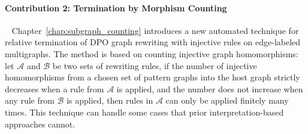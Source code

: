 \paragraph{Contribution 2: Termination by Morphism Counting}
\ \newline
Chapter~\ref{chap:subgraph_counting} introduces a new automated technique for relative termination of DPO graph rewriting with injective rules on edge-labeled multigraphs.
The method is based on counting injective graph homomorphisms: let $\mathcal{A}$ and $\mathcal{B}$ be two sets of rewriting rules, if the number of injective homomorphisms from a chosen set of pattern graphs into the host graph strictly decreases when a rule from $\mathcal{A}$ is applied, and the number does not increase when any rule from $\mathcal{B}$ is applied, then rules in $\mathcal{A}$ can only be applied finitely many times. This technique can handle some cases that prior interpretation-based approaches cannot.

